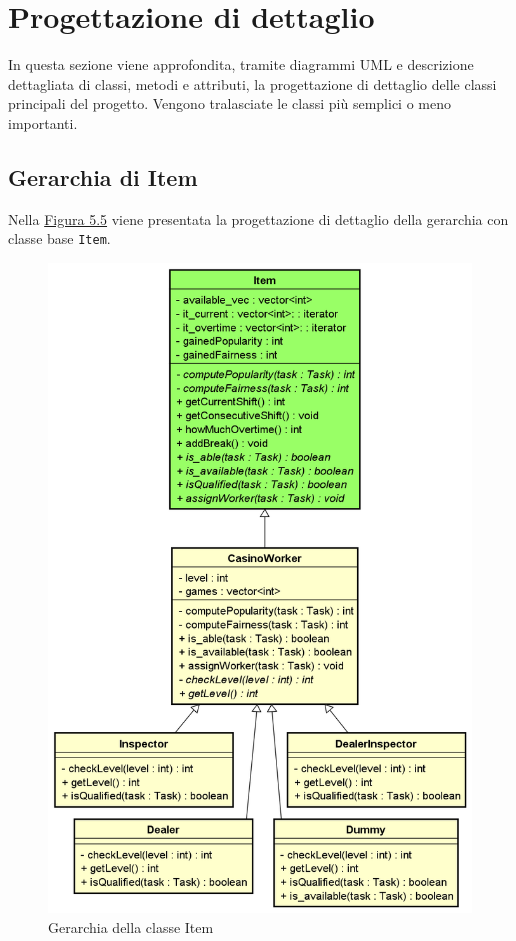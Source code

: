 \section{Progettazione di dettaglio}
In questa sezione viene approfondita, tramite diagrammi UML e descrizione dettagliata di classi, metodi e attributi, la progettazione di dettaglio delle classi principali del progetto. Vengono tralasciate le classi più semplici o meno importanti.
\newpage
\subsection{Gerarchia di Item}
Nella \hyperref[fig55]{Figura 5.5} viene presentata la progettazione di dettaglio della gerarchia con classe base \texttt{Item}.
\begin{figure}[!h]
    \label{fig55}
    \begin{widepage}
        \centering
        \includegraphics[width=12cm,keepaspectratio]{../immagini/progettazione/item.png}
        \caption{Gerarchia della classe Item}
    \end{widepage}
\end{figure}
\FloatBarrier
\noindent
